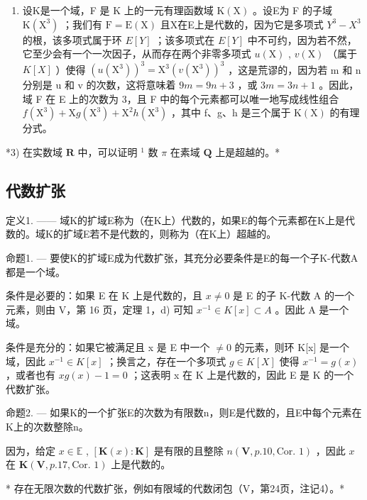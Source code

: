\begin{enumerate}
\def\labelenumi{\arabic{enumi})}
\setcounter{enumi}{1}
\tightlist
\item
  设K是一个域，F 是 K 上的一元有理函数域 \(\mathrm{K}(\mathrm{X})\) 。设E为 F 的子域 \(\mathrm{K}(\mathrm{X}^{3})\) ；我们有 \(\mathrm{F} = \mathrm{E}(\mathrm{X})\) 且X在E上是代数的，因为它是多项式 \(Y^{3} - X^{3}\) 的根，该多项式属于环 \(E[Y]\) ；该多项式在 \(E[Y]\) 中不可约，因为若不然，它至少会有一个一次因子，从而存在两个非零多项式 \(u(\mathrm{X})\) , \(v(\mathrm{X})\) （属于 \(K[X]\) ）使得 \((u(\mathrm{X}^{3}))^{3} = \mathrm{X}^{3}(v(\mathrm{X}^{3}))^{3}\) ，这是荒谬的，因为若 m 和 n 分别是 u 和 v 的次数，这将意味着 \(9m = 9n + 3\) ，或 \(3m = 3n + 1\) 。因此，域 F 在 E 上的次数为 3，且 F 中的每个元素都可以唯一地写成线性组合 \(f(\mathrm{X}^{3}) + \mathrm{X}g(\mathrm{X}^{3}) + \mathrm{X}^{2}h(\mathrm{X}^{3})\) ，其中 f、g、h 是三个属于 \(\mathrm{K}(\mathrm{X})\) 的有理分式。
\end{enumerate}

*3) 在实数域 \(\mathbf{R}\) 中，可以证明 \(^1\) 数 \(\pi\) 在素域 \(\mathbf{Q}\) 上是超越的。*

\subsection{代数扩张}

定义1. —— 域K的扩域E称为（在K上）代数的，如果E的每个元素都在K上是代数的。域K的扩域E若不是代数的，则称为（在K上）超越的。

命题1. --- 要使K的扩域E成为代数扩张，其充分必要条件是E的每一个子K-代数A都是一个域。

条件是必要的：如果 E 在 K 上是代数的，且 \(x \neq 0\) 是 E 的子 K-代数 A 的一个元素，则由 V，第 16 页，定理 1，d) 可知 \(x^{-1} \in K[x] \subset A\) 。因此 A 是一个域。

条件是充分的：如果它被满足且 x 是 E 中一个 \(\neq 0\) 的元素，则环 K{[}x{]} 是一个域，因此 \(x^{-1} \in K[x]\) ；换言之，存在一个多项式 \(g \in K[X]\) 使得 \(x^{-1} = g(x)\) ，或者也有 \(xg(x) - 1 = 0\) ；这表明 x 在 K 上是代数的，因此 E 是 K 的一个代数扩张。

命题2. --- 如果K的一个扩张E的次数为有限数n，则E是代数的，且E中每个元素在K上的次数整除n。

因为，给定 \(x \in \mathbb{E}\) , \([\mathbf{K}(x): \mathbf{K}]\) 是有限的且整除 \(n(\mathbf{V}, p. 10, \text{Cor. } 1)\) ，因此 \(x\) 在 \(\mathbf{K}(\mathbf{V}, p. 17, \text{Cor. } 1)\) 上是代数的。

* 存在无限次数的代数扩张，例如有限域的代数闭包（V，第24页，注记4）。*

